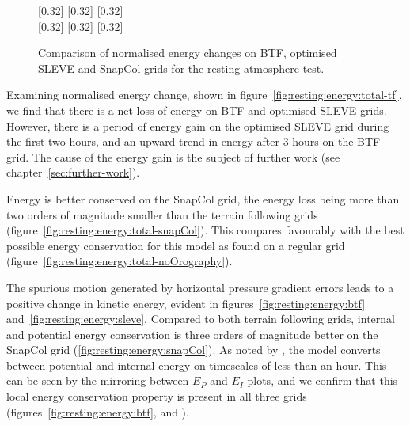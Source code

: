 \begin{figure}
	\captionsetup[subfigure]{position=b}
	\centering
	[0.32\textwidth]{}
	\hfill
	[0.32\textwidth]{}
	\hfill
	[0.32\textwidth]{}
	\\
	[0.32\textwidth]{}
	\hfill
	[0.32\textwidth]{}
	\hfill
	[0.32\textwidth]{}
	\caption{Comparison of normalised energy changes on BTF, optimised SLEVE and SnapCol grids for the resting atmosphere test.}
	\label{fig:resting:energy}
\end{figure}

Examining normalised energy change, shown in figure~\ref{fig:resting:energy:total-tf}, we find that there is a net loss of energy on BTF and optimised SLEVE grids.  However, there is a period of energy gain on the optimised SLEVE grid during the first two hours, and an upward trend in energy after 3 hours on the BTF grid.  The cause of the energy gain is the subject of further work (see chapter~\ref{sec:further-work}).

Energy is better conserved on the SnapCol grid, the energy loss being more than two orders of magnitude smaller than the terrain following grids (figure~\ref{fig:resting:energy:total-snapCol}).  This compares favourably with the best possible energy conservation for this model as found on a regular grid (figure~\ref{fig:resting:energy:total-noOrography}).

The spurious motion generated by horizontal pressure gradient errors leads to a positive change in kinetic energy, evident in figures~\ref{fig:resting:energy:btf} and~\ref{fig:resting:energy:sleve}.  Compared to both terrain following grids, internal and potential energy conservation is three orders of magnitude better on the SnapCol grid (\ref{fig:resting:energy:snapCol}).  As noted by \textcite{weller-shahrokhi2014}, the model converts between potential and internal energy on timescales of less than an hour.  This can be seen by the mirroring between $E_P$ and $E_I$ plots, and we confirm that this local energy conservation property is present in all three grids (figures~\ref{fig:resting:energy:btf},  and ).

